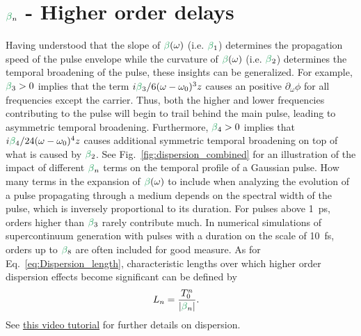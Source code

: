 \section{$\betag_n$ - Higher order delays}
Having understood that the slope of $\betag(\omega)$ (i.e. $\betag_1$) determines the propagation speed of the pulse envelope while the curvature of $\betag(\omega)$ (i.e. $\betag_2$) determines the temporal broadening of the pulse, these insights can be generalized. For example, $\betag_3>0$ implies that the term $i\betag_3/6(\omega-\omega_0)^3z$ causes an positive $\partial_\omega\phi$ for all frequencies except the carrier. Thus, both the higher and lower frequencies contributing to the pulse will begin to trail behind the main pulse, leading to asymmetric temporal broadening. Furthermore, $\betag_4>0$ implies that $i\betag_4/24(\omega-\omega_0)^4z$ causes additional symmetric temporal broadening on top of what is caused by $\betag_2$. See Fig.~\ref{fig:dispersion_combined} for an illustration of the impact of different $\betag_n$ terms on the temporal profile of a Gaussian pulse. How many terms in the expansion of $\betag(\omega)$ to include when analyzing the evolution of a pulse propagating through a medium depends on the spectral width of the pulse, which is inversely proportional to its duration. For pulses above 1~ps, orders higher than $\betag_3$ rarely contribute much. In numerical simulations of supercontinuum generation with pulses with a duration on the scale of 10~fs, orders up to $\betag_8$ are often included for good measure. As for Eq.~\ref{eq:Dispersion_length}, characteristic lengths over which higher order dispersion effects become significant can be defined by
\begin{align}
\label{eq:dispersion_length_general}
    L_{n} &= \frac{T_0^n}{|\betag_n|}.
\end{align}
See \href{https://www.youtube.com/watch?v=E3S0BQiy3p8&ab_channel=YourFavouriteTA}{this video tutorial} for further details on dispersion.

